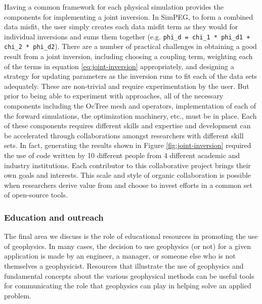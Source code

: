 Having a common framework for each physical simulation provides the components for implementing a joint inversion. In SimPEG, to form a combined data misfit, the user simply creates each data misfit term as they would for individual inversions and sums them together (e.g. \texttt{phi\_d = chi\_1 * phi\_d1 + chi\_2 * phi\_d2}). There are a number of practical challenges in obtaining a good result from a joint inversion, including choosing a coupling term, weighting each of the terms in equation \ref{eq:joint-inversion} appropriately, and designing a strategy for updating parameters as the inversion runs to fit each of the data sets adequately. These are non-trivial and require experimentation by the user. But prior to being able to experiment with approaches, all of the necessary components including the OcTree mesh and operators, implementation of each of the forward simulations, the optimization machinery, etc., must be in place. Each of these components requires different skills and expertise and development can be accelerated through collaborations amongst researchers with different skill sets. In fact, generating the results shown in Figure \ref{fig:joint-inversion} required the use of code written by 10 different people from 4 different academic and industry institutions. Each contributor to this collaborative project brings their own goals and interests. This scale and style of organic collaboration is possible when researchers derive value from and choose to invest efforts in a common set of open-source tools.


\subsubsection{Education and outreach}

The final area we discuss is the role of educational resources in promoting the use of geophysics. In many cases, the decision to use geophysics (or not) for a given application is made by an engineer, a manager, or someone else who is not themselves a geophysicist. Resources that illustrate the use of geophysics and fundamental concepts about the various geophysical methods can be useful tools for communicating the role that geophysics can play in helping solve an applied problem.

